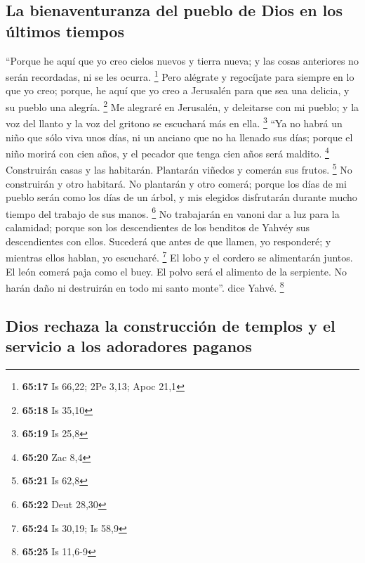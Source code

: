 \hypertarget{la-bienaventuranza-del-pueblo-de-dios-en-los-uxfaltimos-tiempos}{%
\subsection{La bienaventuranza del pueblo de Dios en los últimos
tiempos}\label{la-bienaventuranza-del-pueblo-de-dios-en-los-uxfaltimos-tiempos}}

 ``Porque he aquí que yo creo cielos nuevos y tierra
nueva; y las cosas anteriores no serán recordadas, ni se les ocurra.
\footnote{\textbf{65:17} Is 66,22; 2Pe 3,13; Apoc 21,1} 
Pero alégrate y regocíjate para siempre en lo que yo creo; porque, he
aquí que yo creo a Jerusalén para que sea una delicia, y su pueblo una
alegría. \footnote{\textbf{65:18} Is 35,10}  Me alegraré
en Jerusalén, y deleitarse con mi pueblo; y la voz del llanto y la voz
del gritono se escuchará más en ella. \footnote{\textbf{65:19} Is 25,8}
 ``Ya no habrá un niño que sólo viva unos días, ni un
anciano que no ha llenado sus días; porque el niño morirá con cien años,
y el pecador que tenga cien años será maldito. \footnote{\textbf{65:20}
  Zac 8,4}  Construirán casas y las habitarán. Plantarán
viñedos y comerán sus frutos. \footnote{\textbf{65:21} Is 62,8}
 No construirán y otro habitará. No plantarán y otro
comerá; porque los días de mi pueblo serán como los días de un árbol, y
mis elegidos disfrutarán durante mucho tiempo del trabajo de sus manos.
\footnote{\textbf{65:22} Deut 28,30}  No trabajarán en
vanoni dar a luz para la calamidad; porque son los descendientes de los
benditos de Yahvéy sus descendientes con ellos.  Sucederá
que antes de que llamen, yo responderé; y mientras ellos hablan, yo
escucharé. \footnote{\textbf{65:24} Is 30,19; Is 58,9} 
El lobo y el cordero se alimentarán juntos. El león comerá paja como el
buey. El polvo será el alimento de la serpiente. No harán daño ni
destruirán en todo mi santo monte''. dice Yahvé. \footnote{\textbf{65:25}
  Is 11,6-9}

\hypertarget{dios-rechaza-la-construcciuxf3n-de-templos-y-el-servicio-a-los-adoradores-paganos}{%
\subsection{Dios rechaza la construcción de templos y el servicio a los
adoradores
paganos}\label{dios-rechaza-la-construcciuxf3n-de-templos-y-el-servicio-a-los-adoradores-paganos}}

